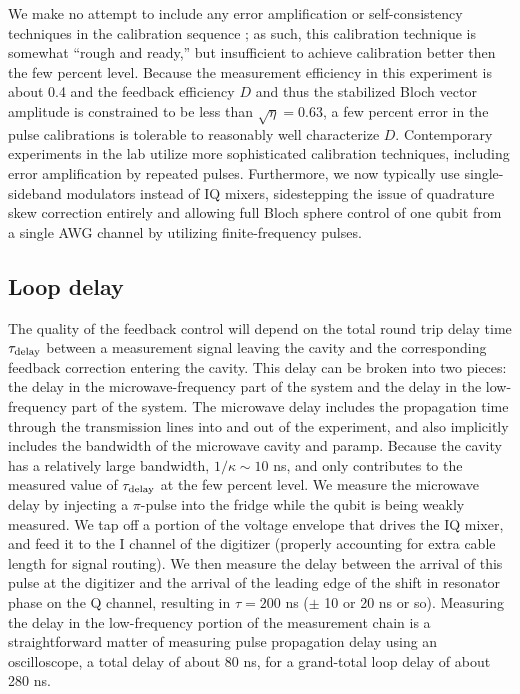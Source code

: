 We make no attempt to include any error amplification or self-consistency techniques in the calibration sequence \cite{Chow2009,Merkel2013,Blume-Kohout2013}; as such, this calibration technique is somewhat ``rough and ready,'' but insufficient to achieve calibration better then the few percent level.  Because the measurement efficiency in this experiment is about 0.4 and the feedback efficiency $D$ and thus the stabilized Bloch vector amplitude is constrained to be less than $\sqrt{\eta} = 0.63$, a few percent error in the pulse calibrations is tolerable to reasonably well characterize $D$.  Contemporary experiments in the lab utilize more sophisticated calibration techniques, including error amplification by repeated pulses.  Furthermore, we now typically use single-sideband modulators instead of IQ mixers, sidestepping the issue of quadrature skew correction entirely and allowing full Bloch sphere control of one qubit from a single AWG channel by utilizing finite-frequency pulses.

\subsection{Loop delay}\label{s:loop_delay}

The quality of the feedback control will depend on the total round trip delay time $\tau_{\rm delay}$ between a measurement signal leaving the cavity and the corresponding feedback correction entering the cavity.  This delay can be broken into two pieces: the delay in the microwave-frequency part of the system and the delay in the low-frequency part of the system.  The microwave delay includes the propagation time through the transmission lines into and out of the experiment, and also implicitly includes the bandwidth of the microwave cavity and paramp.  Because the cavity has a relatively large bandwidth, $1/\kappa \sim 10$ ns, and only contributes to the measured value of $\tau_{\rm delay}$ at the few percent level.  We measure the microwave delay by injecting a $\pi$-pulse into the fridge while the qubit is being weakly measured.  We tap off a portion of the voltage envelope that drives the IQ mixer, and feed it to the I channel of the digitizer (properly accounting for extra cable length for signal routing).  We then measure the delay between the arrival of this pulse at the digitizer and the arrival of the leading edge of the shift in resonator phase on the Q channel, resulting in $\tau = 200$ ns ($\pm$ 10 or 20 ns or so).  Measuring the delay in the low-frequency portion of the measurement chain is a straightforward matter of measuring pulse propagation delay using an oscilloscope, a total delay of about 80 ns, for a grand-total loop delay of about 280 ns.


